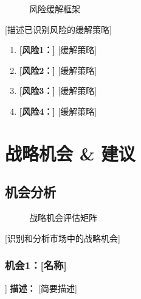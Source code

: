 \documentclass[11pt,letterpaper]{report}
\begin{document}
{%

\begin{figure}[htbp]
\centering
\caption{风险缓解框架}
\label{fig:risk_mitigation}
\end{figure}

[描述已识别风险的缓解策略]

\begin{riskbox}[风险缓解总结]
\begin{enumerate}
    \item \textbf{[风险1：]} [缓解策略]
    \item \textbf{[风险2：]} [缓解策略]
    \item \textbf{[风险3：]} [缓解策略]
    \item \textbf{[风险4：]} [缓解策略]
\end{enumerate}
\end{riskbox}

\chapter{战略机会 \& 建议}

\section{机会分析}


\begin{figure}[htbp]
\centering
\caption{战略机会评估矩阵}
\label{fig:opportunity_matrix}
\end{figure}

[识别和分析市场中的战略机会]

\subsection{机会1：[名称]}
\begin{opportunitybox}[机会：[名称]]
\textbf{描述：} [简要描述]


\end{opportunitybox}}
\end{document}
